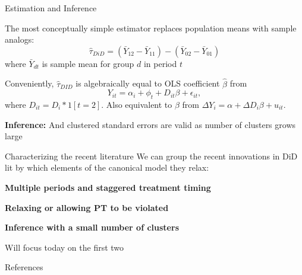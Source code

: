 \documentclass[aspectratio = 169, 12pt]{beamer}
\begin{document}
\begin{frame}{Estimation and Inference}
	\begin{wideitemize}
		\item
		The most conceptually simple estimator replaces population means with sample analogs:
		$$\hat{\tau}_{DiD} = (\bar{Y}_{12} - \bar{Y}_{11}) - (\bar{Y}_{02} - \bar{Y}_{01}) $$
		\noindent where $\bar{Y}_{dt}$ is sample mean for group $d$ in period $t$
		
		\pause
		\item
		Conveniently, $\hat\tau_{DID}$ is algebraically equal to OLS coefficient $\hat\beta$ from
		\begin{equation}
			Y_{it} = \alpha_i + \phi_t + D_{it} \beta  + \epsilon_{it}, \label{eqn: TWFE-2-periods}
		\end{equation}
		\noindent where $D_{it} = D_i * 1[t=2]$. Also equivalent to $\beta$ from $\Delta Y_{i} = \alpha +  \Delta D_i \beta + u_{it}$.
		\pause
		\item
		\textbf{Inference:} And clustered standard errors are valid as number of clusters grows large
	\end{wideitemize}
\end{frame}

\begin{frame}{Characterizing the recent literature}
	We can group the recent innovations in DiD lit by which elements of the canonical model they relax:
	\medskip
	
	\begin{wideitemize}
		\item
		\textbf{Multiple periods and staggered treatment timing}
		
		\item
		\textbf{Relaxing or allowing PT to be violated}
		
		\item
		\textbf{Inference with a small number of clusters}
		
	\end{wideitemize}
	\medskip
	Will focus today on the first two
\end{frame}

\nocite{roth_whats_2023}

\backupbegin
\begin{frame}{References}
  
\end{frame}
\backupend
\end{document}
